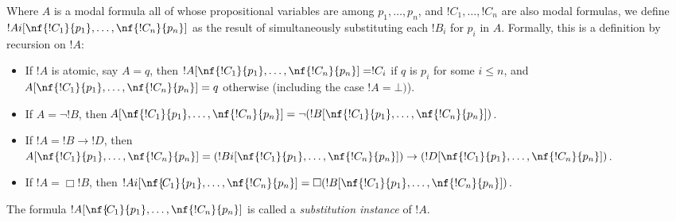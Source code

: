 \documentclass[modal-logic]{subfiles}
\begin{document}

\begin{defn}\label{def:subst-inst}
  Where $\!A$ is a modal formula all of whose propositional variables are among $p_1,\ldots, p_n$,
  and $!C_1,\ldots,!C_n$ are also modal formulas, we define $!Ai[\nf{!C_1}{p_1}, \ldots, \nf{!C_n}{p_n}]$
  as the result of simultaneously substituting each $!B_i$ for
  $p_i$ in $\!A$. Formally, this is a definition by recursion on
  $!A$:
  \begin{itemize}
  \item If $!A$ is atomic, say $\!A= q$, then
    $!A[\nf{!C_1}{p_1}, \ldots, \nf{!C_n}{p_n}] =
    !C_i$ if $q$ is $p_i$ for some $i \le n$, and
    $\!A[\nf{!C_1}{p_1}, \ldots, \nf{!C_n}{p_n}] = q$
    otherwise (including the case $!A = \bot)$).
  \item If $\!A = \lnot!B$, then $\!A[\nf{!C_1}{p_1},
    \ldots, \nf{!C_n}{p_n}] = \lnot (!B[\nf{!C_1}{p_1},
    \ldots, \nf{!C_n}{p_n}])$.
  \item If $!A = !B \to !D$, then
    $\!A[\nf{!C_1}{p_1}, \ldots, \nf{!C_n}{p_n}] =
    (!Bi[\nf{!C_1}{p_1}, \ldots, \nf{!C_n}{p_n}]) \to
    (!D[\nf{!C_1}{p_1}, \ldots, \nf{!C_n}{p_n}])$.
  \item If $!A = \Box !B$, then  $!Ai[\nf{\!C_1}{p_1},
    \ldots, \nf{!C_n}{p_n}] = \Box (!B[\nf{!C_1}{p_1},
    \ldots, \nf{!C_n}{p_n}])$. 
  \end{itemize}
The formula  $!A[\nf{\!C_1}{p_1}, \ldots, \nf{!C_n}{p_n}]$
is called a \emph{substitution instance} of $!A$. 
\end{defn}
\end{document}
